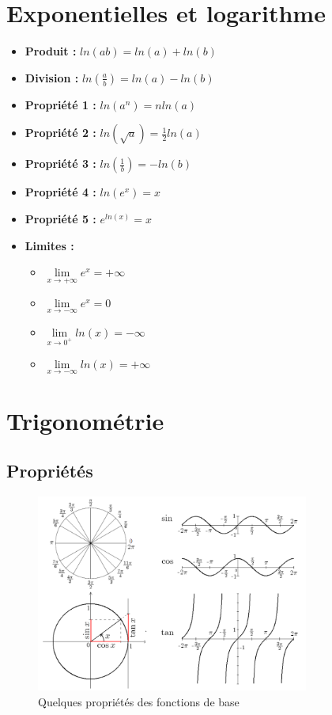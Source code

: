 \documentclass[12]{article}%
\theoremstyle{plain}
\theoremstyle{definition}
\theoremstyle{remark}
\begin{document}
\section{Exponentielles et logarithme}
\large
\begin{itemize}
	\item \textbf{Produit :} \( \boxed{ln(ab) = ln(a) + ln(b)} \)
	\item \textbf{Division :} \( \boxed{ln\left (\frac{a}{b}\right ) = ln(a) - ln(b)} \)
	\item \textbf{Propriété 1 :} \( \boxed{ln(a^{n}) = nln(a)} \)
	\item \textbf{Propriété 2 :} \( \boxed{ln\left (\sqrt{a}\right ) = \frac{1}{2}ln(a)} \)
	\item \textbf{Propriété 3 :} \( \boxed{ln\left (\frac{1}{b}\right ) = -ln(b)} \)
	\item \textbf{Propriété 4 :} \( \boxed{ln(e^{x}) = x} \)
	\item \textbf{Propriété 5 :} \( \boxed{e^{ln(x)} = x} \)
	\item \textbf{Limites :}
	\begin{itemize}
		\item \( \boxed{\lim\limits_{x \to +\infty} e^{x} = +\infty} \)
		\item \( \boxed{\lim\limits_{x \to -\infty} e^{x} = 0} \)
		
		\item \( \boxed{\lim\limits_{x \to 0^{+}} ln(x) = -\infty} \)
		\item \( \boxed{\lim\limits_{x \to -\infty} ln(x) = +\infty} \)
	\end{itemize}
\end{itemize}

\newpage
\section{Trigonométrie}
\subsection{Propriétés}
\begin{figure}[h] %
	\centering
	\includegraphics[width=0.8\textwidth]{./images/trigonometrie.png} %
	\caption{Quelques propriétés des fonctions de base}
	\label{fig:trigonometrie} %
\end{figure}
\end{document}
